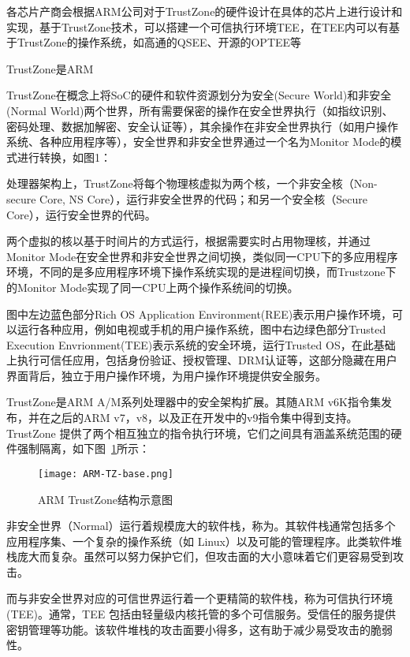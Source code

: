各芯片产商会根据ARM公司对于TrustZone的硬件设计在具体的芯片上进行设计和实现，基于TrustZone技术，可以搭建一个可信执行环境TEE，在TEE内可以有基于TrustZone的操作系统，如高通的QSEE、开源的OPTEE等


TrustZone是ARM

TrustZone在概念上将SoC的硬件和软件资源划分为安全(Secure World)和非安全(Normal World)两个世界，所有需要保密的操作在安全世界执行（如指纹识别、密码处理、数据加解密、安全认证等），其余操作在非安全世界执行（如用户操作系统、各种应用程序等），安全世界和非安全世界通过一个名为Monitor Mode的模式进行转换，如图1：

处理器架构上，TrustZone将每个物理核虚拟为两个核，一个非安全核（Non-secure Core, NS Core），运行非安全世界的代码；和另一个安全核（Secure Core），运行安全世界的代码。

两个虚拟的核以基于时间片的方式运行，根据需要实时占用物理核，并通过Monitor Mode在安全世界和非安全世界之间切换，类似同一CPU下的多应用程序环境，不同的是多应用程序环境下操作系统实现的是进程间切换，而Trustzone下的Monitor Mode实现了同一CPU上两个操作系统间的切换。


图中左边蓝色部分Rich OS Application Environment(REE)表示用户操作环境，可以运行各种应用，例如电视或手机的用户操作系统，图中右边绿色部分Trusted Execution Envrionment(TEE)表示系统的安全环境，运行Trusted OS，在此基础上执行可信任应用，包括身份验证、授权管理、DRM认证等，这部分隐藏在用户界面背后，独立于用户操作环境，为用户操作环境提供安全服务。



TrustZone是ARM A/M系列处理器中的安全架构扩展。其随ARM v6K指令集发布，并在之后的ARM v7，v8，以及正在开发中的v9指令集中得到支持。TrustZone 提供了两个相互独立的指令执行环境，它们之间具有涵盖系统范围的硬件强制隔离，如下图~\ref{fig:ARM-TZ-base}所示：

\begin{figure}[!htb]
    \small
    \centering
    \texttt{[image: ARM-TZ-base.png]}
    \caption{ARM TrustZone结构示意图} 
    \label{fig:ARM-TZ-base}
\end{figure}

非安全世界（Normal）运行着规模庞大的软件栈，称为。其软件栈通常包括多个应用程序集、一个复杂的操作系统（如 Linux）以及可能的管理程序。此类软件堆栈庞大而复杂。虽然可以努力保护它们，但攻击面的大小意味着它们更容易受到攻击。

而与非安全世界对应的可信世界运行着一个更精简的软件栈，称为可信执行环境 (TEE)。通常，TEE 包括由轻量级内核托管的多个可信服务。受信任的服务提供密钥管理等功能。该软件堆栈的攻击面要小得多，这有助于减少易受攻击的脆弱性。

